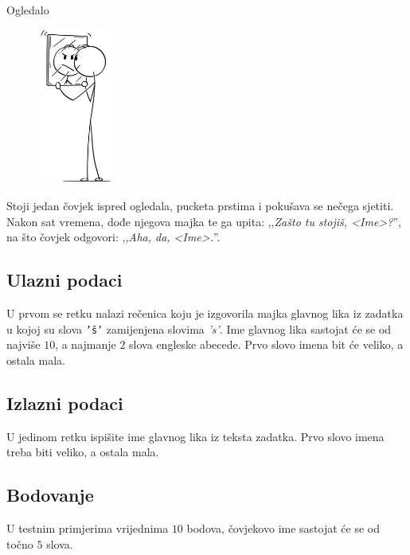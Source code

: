 \begin{statement}[
  problempoints=20,
  timelimit=1 sekunda,
  memorylimit=512 MiB,
]{Ogledalo}

\setlength\intextsep{-0.1cm}
\begin{figure}
\centering
\includegraphics[width=0.22\textwidth]{img/ogledalo.png}
\end{figure}

Stoji jedan čovjek ispred ogledala, pucketa prstima i pokušava se nečega
sjetiti. Nakon sat vremena, dođe njegova majka te ga upita: ,,\textit{Zašto
tu stojiš, <Ime>?}'', na što čovjek odgovori: ,,\textit{Aha, da, <Ime>.}''.

\subsection*{Ulazni podaci}
U prvom se retku nalazi rečenica koju je izgovorila majka glavnog lika iz
zadatka u kojoj su slova \texttt{'š'} zamijenjena slovima \textit{'s'}. Ime
glavnog lika sastojat će se od najviše $10$, a najmanje $2$ slova engleske
abecede. Prvo slovo imena bit će veliko, a ostala mala.

\subsection*{Izlazni podaci}
U jedinom retku ispišite ime glavnog lika iz teksta zadatka. Prvo slovo imena
treba biti veliko, a ostala mala.

\subsection*{Bodovanje}
U testnim primjerima vrijednima $10$ bodova, čovjekovo ime sastojat će se od
točno $5$ slova.\\


\end{statement}
